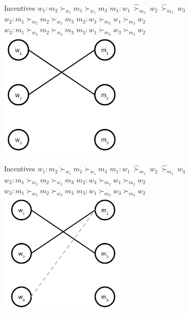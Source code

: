 \begin{frame}{Incentives}
    $w_1: m_2 \succ_{w_1} m_1 \succ_{w_1} m_3$ \tab $m_1: w_1 \ \hat{\succ}_{m_1} \ w_2 \ \hat{\succ}_{m_1} \ w_3$ \\
    $w_2: m_1 \succ_{w_2} m_2 \succ_{w_2} m_3$ \tab $m_2: w_3 \succ_{m_2} w_1 \succ_{m_2} w_2$ \\
    $w_3: m_1 \succ_{w_3} m_2 \succ_{w_3} m_3$ \tab $m_3: w_1 \succ_{m_3} w_3 \succ_{m_3} w_2$ \\
    \centering
    \includegraphics[width=6cm]{img/matching/da2.png}
\end{frame}

\begin{frame}{Incentives}
    $w_1: m_2 \succ_{w_1} m_1 \succ_{w_1} m_3$ \tab $m_1: w_1 \ \hat{\succ}_{m_1} \ w_2 \ \hat{\succ}_{m_1} \ w_3$ \\
    $w_2: m_1 \succ_{w_2} m_2 \succ_{w_2} m_3$ \tab $m_2: w_3 \succ_{m_2} w_1 \succ_{m_2} w_2$ \\
    $w_3: m_1 \succ_{w_3} m_2 \succ_{w_3} m_3$ \tab $m_3: w_1 \succ_{m_3} w_3 \succ_{m_3} w_2$ \\
    \centering
    \includegraphics[width=6cm]{img/matching/dai3.png}
\end{frame}

